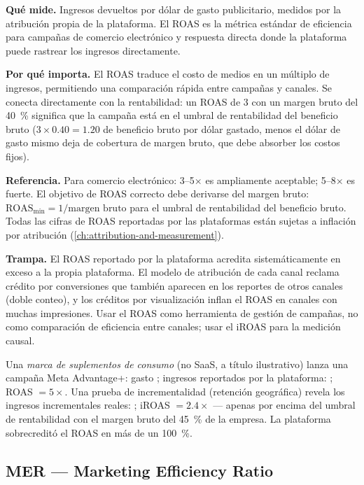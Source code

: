 \textbf{Qué mide.} Ingresos devueltos por dólar de gasto publicitario, medidos por la
atribución propia de la plataforma. El ROAS es la métrica estándar de eficiencia para
campañas de comercio electrónico y respuesta directa donde la plataforma puede rastrear los
ingresos directamente.

\textbf{Por qué importa.} El ROAS traduce el costo de medios en un múltiplo de ingresos,
permitiendo una comparación rápida entre campañas y canales. Se conecta directamente con la
rentabilidad: un ROAS de 3 con un margen bruto del \qty{40}{\percent} significa que la
campaña está en el umbral de rentabilidad del beneficio bruto ($3 \times 0.40 = 1.20$ de
beneficio bruto por dólar gastado, menos el dólar de gasto mismo deja  de
cobertura de margen bruto, que debe absorber los costos fijos).

\textbf{Referencia.} Para comercio electrónico: 3--5$\times$ es ampliamente aceptable;
5--8$\times$ es fuerte. El objetivo de ROAS correcto debe derivarse del margen bruto:
$\mathrm{ROAS}_{\min} = 1/\text{margen bruto}$ para el umbral de rentabilidad del beneficio
bruto. Todas las cifras de ROAS reportadas por las plataformas están sujetas a inflación por
atribución (\cref{ch:attribution-and-measurement}).

\textbf{Trampa.} El ROAS reportado por la plataforma acredita sistemáticamente en exceso a
la propia plataforma. El modelo de atribución de cada canal reclama crédito por conversiones
que también aparecen en los reportes de otros canales (doble conteo), y los créditos por
visualización inflan el ROAS en canales con muchas impresiones. Usar el ROAS como herramienta
de gestión de campañas, no como comparación de eficiencia entre canales; usar el iROAS para
la medición causal.

\begin{example}
Una \textit{marca de suplementos de consumo} (no SaaS, a título ilustrativo) lanza una
campaña Meta Advantage+: gasto ; ingresos reportados por la plataforma:
; ROAS $= 5\times$. Una prueba de incrementalidad (retención geográfica)
revela los ingresos incrementales reales: ; iROAS $= 2.4\times$ --- apenas por
encima del umbral de rentabilidad con el margen bruto del \qty{45}{\percent} de la empresa.
La plataforma sobrecreditó el ROAS en más de un \qty{100}{\percent}.
\end{example}


\subsection{MER --- Marketing Efficiency Ratio}

